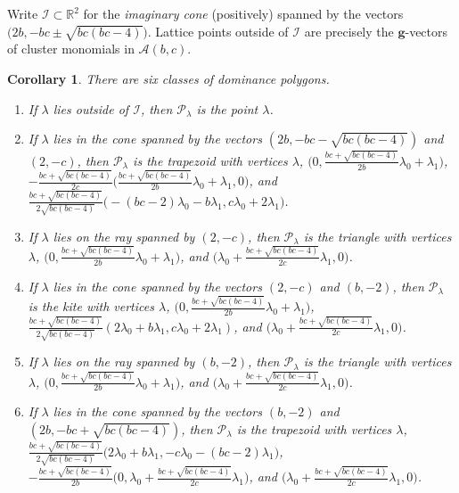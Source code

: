 \documentclass{amsart}
\newtheorem{corollary}[theorem]{Corollary}
\numberwithin{theorem}{section}
\newcommand{\bfg}{\boldsymbol{g}}
\newcommand{\cA}{\mathcal{A}}
\newcommand{\cI}{\mathcal{I}}
\newcommand{\cP}{\mathcal{P}}
\newcommand{\RR}{\mathbb{R}}
\begin{document}
  Write $\cI \subset \RR^2$ for the \emph{imaginary cone} (positively) spanned by the vectors $\big(2b,-bc\pm\sqrt{bc(bc-4)}\big)$.
  Lattice points outside of $\cI$ are precisely the $\bfg$-vectors of cluster monomials in $\cA(b,c)$.
  \begin{corollary}
    \label{cor:dominance vertices}
    There are six classes of dominance polygons.
    \begin{enumerate}
      \item If $\lambda$ lies outside of $\cI$, then $\cP_\lambda$ is the point $\lambda$. 
      \item If $\lambda$ lies in the cone spanned by the vectors $(2b,-bc-\sqrt{bc(bc-4)})$ and $(2,-c)$, then $\cP_\lambda$ is the trapezoid with  vertices $\lambda$, $\big(0,\frac{bc+\sqrt{bc(bc-4)}}{2b}\lambda_0+\lambda_1\big)$, $-\frac{bc+\sqrt{bc(bc-4)}}{2c}\big(\frac{bc+\sqrt{bc(bc-4)}}{2b}\lambda_0+\lambda_1,0\big)$, and ${\frac{bc+\sqrt{bc(bc-4)}}{2\sqrt{bc(bc-4)}}\big(-(bc-2)\lambda_0-b\lambda_1,c\lambda_0+2\lambda_1\big)}$.
      \item If $\lambda$ lies on the ray spanned by $(2,-c)$, then $\cP_\lambda$ is the triangle with vertices $\lambda$, $\big(0,\frac{bc+\sqrt{bc(bc-4)}}{2b}\lambda_0+\lambda_1\big)$, and $\big(\lambda_0+\frac{bc+\sqrt{bc(bc-4)}}{2c}\lambda_1,0\big)$.
      \item If $\lambda$ lies in the cone spanned by the vectors $(2,-c)$ and $(b,-2)$, then $\cP_\lambda$ is the kite with  vertices $\lambda$, $\big(0,\frac{bc+\sqrt{bc(bc-4)}}{2b}\lambda_0+\lambda_1\big)$, $\frac{bc+\sqrt{bc(bc-4)}}{2\sqrt{bc(bc-4)}}(2\lambda_0+b\lambda_1,c\lambda_0+2\lambda_1)$, and $\big(\lambda_0+\frac{bc+\sqrt{bc(bc-4)}}{2c}\lambda_1,0\big)$.
      \item If $\lambda$ lies on the ray spanned by $(b,-2)$, then $\cP_\lambda$ is the triangle with vertices $\lambda$, $\big(0,\frac{bc+\sqrt{bc(bc-4)}}{2b}\lambda_0+\lambda_1\big)$, and $\big(\lambda_0+\frac{bc+\sqrt{bc(bc-4)}}{2c}\lambda_1,0\big)$.
      \item If $\lambda$ lies in the cone spanned by the vectors $(b,-2)$ and $(2b,-bc+\sqrt{bc(bc-4)})$, then $\cP_\lambda$ is the trapezoid with vertices $\lambda$, $\frac{bc+\sqrt{bc(bc-4)}}{2\sqrt{bc(bc-4)}}\big(2\lambda_0+b\lambda_1,-c\lambda_0-(bc-2)\lambda_1\big)$, $-\frac{bc+\sqrt{bc(bc-4)}}{2b}\big(0,\lambda_0+\frac{bc+\sqrt{bc(bc-4)}}{2c}\lambda_1\big)$, and $\big(\lambda_0+\frac{bc+\sqrt{bc(bc-4)}}{2c}\lambda_1,0\big)$.
    \end{enumerate}
  \end{corollary}
\end{document}
